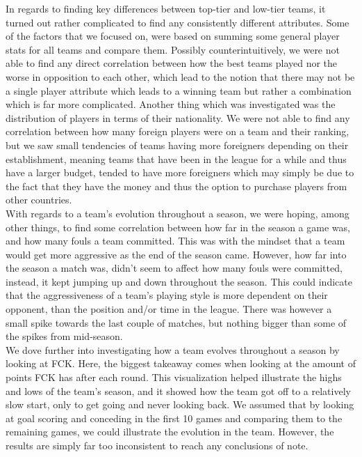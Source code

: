 \documentclass[Report.tex]{subfiles}
\begin{document}
In regards to finding key differences between top-tier and low-tier teams, it turned out rather complicated to find any consistently different attributes. Some of the factors that we focused on, were based on summing some general player stats for all teams and compare them. Possibly counterintuitively, we were not able to find any direct correlation between how the best teams played nor the worse in opposition to each other, which lead to the notion that there may not be a single player attribute which leads to a winning team but rather a combination which is far more complicated. Another thing which was investigated was the distribution of players in terms of their nationality. We were not able to find any correlation between how many foreign players were on a team and their ranking, but we saw small tendencies of teams having more foreigners depending on their establishment, meaning teams that have been in the league for a while and thus have a larger budget, tended to have more foreigners which may simply be due to the fact that they have the money and thus the option to purchase players from other countries. \\
With regards to a team's evolution throughout a season, we were hoping, among other things, to find some correlation between how far in the season a game was, and how many fouls a team committed.
This was with the mindset that a team would get more aggressive as the end of the season came. However, how far into the season a match was, didn't seem to affect how many fouls were committed, instead, it kept jumping up and down throughout the season. This could indicate that the aggressiveness of a team's playing style is more dependent on their opponent, than the position and/or time in the league. There was however a small spike towards the last couple of matches, but nothing bigger than some of the spikes from mid-season.\\

We dove further into investigating how a team evolves throughout a season by looking at FCK. Here, the biggest takeaway comes when looking at the amount of points FCK has after each round. This visualization helped illustrate the highs and lows of the team’s season, and it showed how the team got off to a relatively slow start, only to get going and never looking back. We assumed that by looking at goal scoring and conceding in the first 10 games and comparing them to the remaining games, we could illustrate the evolution in the team. However, the results are simply far too inconsistent to reach any conclusions of note. 
\end{document}
